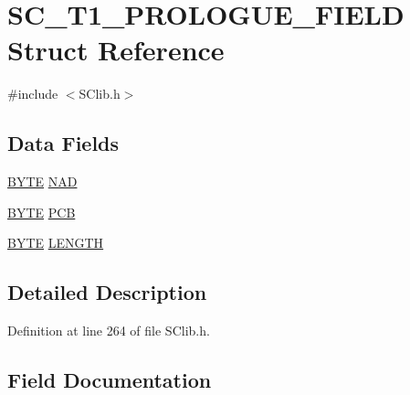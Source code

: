 \hypertarget{struct_s_c___t1___p_r_o_l_o_g_u_e___f_i_e_l_d}{}\section{S\+C\+\_\+\+T1\+\_\+\+P\+R\+O\+L\+O\+G\+U\+E\+\_\+\+F\+I\+E\+L\+D Struct Reference}
\label{struct_s_c___t1___p_r_o_l_o_g_u_e___f_i_e_l_d}


{\ttfamily \#include $<$S\+Clib.\+h$>$}

\subsection*{Data Fields}
\begin{DoxyCompactItemize}
\item 
\hyperlink{_generic_type_defs_8h_a4ae1dab0fb4b072a66584546209e7d58}{B\+Y\+T\+E} \hyperlink{struct_s_c___t1___p_r_o_l_o_g_u_e___f_i_e_l_d_a455e056e4d36a98838cbb0044f30c56f}{N\+A\+D}
\item 
\hyperlink{_generic_type_defs_8h_a4ae1dab0fb4b072a66584546209e7d58}{B\+Y\+T\+E} \hyperlink{struct_s_c___t1___p_r_o_l_o_g_u_e___f_i_e_l_d_abfc828b1412864bc4558c81fb72adfd0}{P\+C\+B}
\item 
\hyperlink{_generic_type_defs_8h_a4ae1dab0fb4b072a66584546209e7d58}{B\+Y\+T\+E} \hyperlink{struct_s_c___t1___p_r_o_l_o_g_u_e___f_i_e_l_d_abf22f15f6378ae410118b8707989cdeb}{L\+E\+N\+G\+T\+H}
\end{DoxyCompactItemize}


\subsection{Detailed Description}


Definition at line 264 of file S\+Clib.\+h.



\subsection{Field Documentation}
\hypertarget{struct_s_c___t1___p_r_o_l_o_g_u_e___f_i_e_l_d_abf22f15f6378ae410118b8707989cdeb}{}
